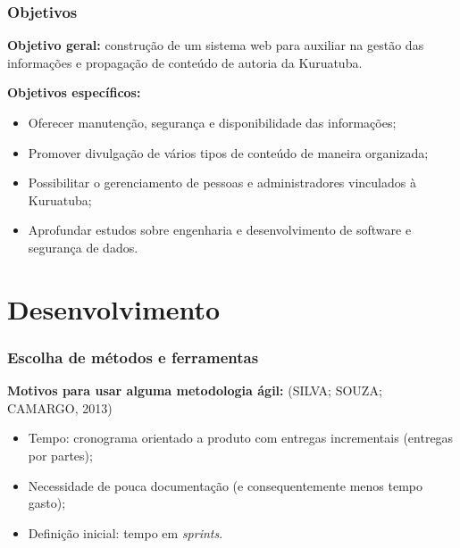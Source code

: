 \documentclass[xcolor=table]{beamer}
\begin{document}
\begin{frame}
    \frametitle{Objetivos}
    \textbf{Objetivo geral:} construção de um sistema web para auxiliar na gestão das informações e propagação de conteúdo de autoria da Kuruatuba.
    
    \textbf{Objetivos específicos:}
    \begin{itemize}
        \item Oferecer manutenção, segurança e disponibilidade das informações;
        \item Promover divulgação de vários tipos de conteúdo de maneira organizada;
        \item Possibilitar o gerenciamento de pessoas e administradores vinculados à Kuruatuba;
        \item Aprofundar estudos sobre engenharia e desenvolvimento de software e segurança de dados.
    \end{itemize}
\end{frame}


\section{Desenvolvimento}
\begin{frame}
    \frametitle{Escolha de métodos e ferramentas}
    \textbf{Motivos para usar alguma metodologia ágil:} (SILVA; SOUZA; CAMARGO, 2013)
    \begin{itemize}
        \item Tempo: cronograma orientado a produto com entregas incrementais (entregas por partes); %
        \item Necessidade de pouca documentação (e consequentemente menos tempo gasto); 
        \item Definição inicial: tempo em \textit{sprints}.
    \end{itemize}
    
\end{frame}
\end{document}

